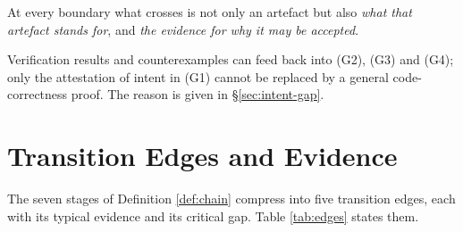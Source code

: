 \begin{principle}\label{pr:boundary}
At every boundary what crosses is not only an artefact but also \emph{what that artefact
stands for}, and \emph{the evidence for why it may be accepted}.
\end{principle}

\begin{remark}
Verification results and counterexamples can feed back into (G2), (G3) and (G4); only the
attestation of intent in (G1) cannot be replaced by a general code-correctness proof. The
reason is given in \S\ref{sec:intent-gap}.
\end{remark}

\section{Transition Edges and Evidence}\label{sec:five-edges}

The seven stages of Definition \ref{def:chain} compress into five transition edges, each
with its typical evidence and its critical gap. Table \ref{tab:edges} states them.

